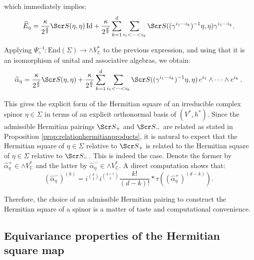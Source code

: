 \documentclass[10pt,a4paper,twoside,reqno]{amsart}
\theoremstyle{plain}
\theoremstyle{definition}
\theoremstyle{remark}
\newcommand{\End}{\mathrm{End}}
\def\C{\mathbb{C}}
\def\Id{\mathrm{Id}}
\def\scS{\Scr S}
\begin{document}
\noindent
which immediately implies:
\begin{eqnarray*}
\widehat{E}_{\eta} = \frac{\kappa}{2^{\frac{d}{2}}} \scS(\eta,\eta)\, \Id + \frac{\kappa}{2^{\frac{d}{2}}} \sum_{k=1}^d \sum_{i_1 < \cdots <i_k} \scS((\gamma^{i_1 \cdots i_k})^{-1}\eta , \eta)\gamma^{i_1 \cdots i_k}.
\end{eqnarray*}

\noindent
Applying $\Psi^{-1}_{\gamma} \colon \End(\Sigma) \to \wedge V^{\ast}_{\C}$ to the previous expression, and using that it is an isomorphism of unital and associative algebras, we obtain:
\begin{eqnarray}
\label{eq:explicitHermitian}
\widehat{\alpha}_{\eta} = \frac{\kappa}{2^{\frac{d}{2}}} \scS(\eta,\eta) + \frac{\kappa}{2^{\frac{d}{2}}} \sum_{k=1}^d \sum_{i_1 < \cdots < i_k} \scS((\gamma^{i_1 \cdots i_k})^{-1}\eta , \eta)\, e^{i_1}\wedge  \cdots \wedge e^{i_k}\, .
\end{eqnarray}

\noindent
This gives the explicit form of the Hermitian square of an irreducible complex spinor $\eta \in \Sigma$ in terms of an explicit orthonormal basis of $(V^{\ast} , h^{\ast})$. Since the admissible Hermitian pairings $\scS_{+}$ and $\scS_{-}$ are related as stated in Proposition \ref{prop:relationhermitianproducts}, it is natural to expect that the Hermitian square of $\eta\in\Sigma$ relative to $\scS_{+}$ is related to the Hermitian square of $\eta\in \Sigma$ relative to $\scS_{-}$. This is indeed the case. Denote the former by $\widehat{\alpha}_{\eta}^{+} \in \wedge V^{\ast}_{\C}$ and the latter by $\widehat{\alpha}_{\eta}^{-} \in \wedge V^{\ast}_{\C}$. A direct computation shows that:
\begin{equation*}
(\widehat{\alpha}_\eta^-)^{(k)} = i^{\binom{p}{2}}i^{\binom{q+1}{2}}\frac{k!}{(d-k)!}*\tau((\widehat{\alpha}_\eta^+)^{(d-k)}).
\end{equation*}

\noindent
Therefore, the choice of an admissible Hermitian pairing to construct the Hermitian square of a spinor is a matter of taste and computational convenience. 


\subsection{Equivariance properties of the Hermitian square map}
\label{subsec:Hermitianequivariance}
\end{document}

